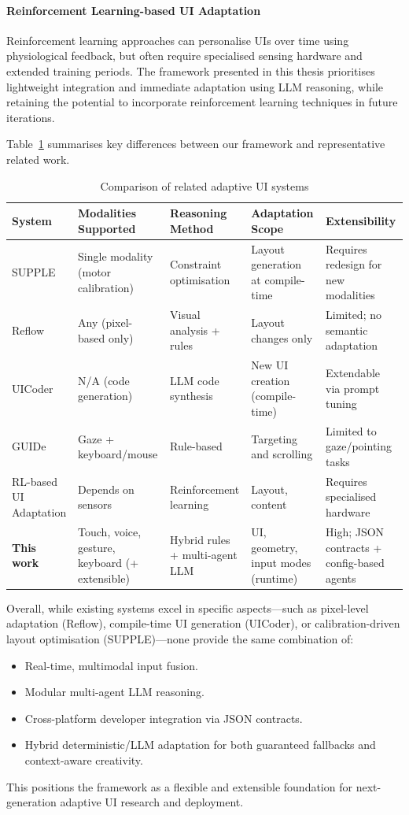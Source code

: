\documentclass[openany]{book}
\begin{document}
\paragraph{Reinforcement Learning-based UI Adaptation \cite{gaspar2023learning}}
Reinforcement learning approaches can personalise UIs over time using physiological feedback, but often require specialised sensing hardware and extended training periods. The framework presented in this thesis prioritises lightweight integration and immediate adaptation using LLM reasoning, while retaining the potential to incorporate reinforcement learning techniques in future iterations.

\medskip
Table~\ref{tab:related-comparison} summarises key differences between our framework and representative related work.

\begin{table}[h]
\centering
\caption{Comparison of related adaptive UI systems}
\label{tab:related-comparison}
\begin{tabular}{p{3cm}p{2.5cm}p{3cm}p{3cm}p{3cm}}
\toprule
\textbf{System} & \textbf{Modalities Supported} & \textbf{Reasoning Method} & \textbf{Adaptation Scope} & \textbf{Extensibility} \\
\midrule
SUPPLE & Single modality (motor calibration) & Constraint optimisation & Layout generation at compile-time & Requires redesign for new modalities \\
Reflow & Any (pixel-based only) & Visual analysis + rules & Layout changes only & Limited; no semantic adaptation \\
UICoder & N/A (code generation) & LLM code synthesis & New UI creation (compile-time) & Extendable via prompt tuning \\
GUIDe & Gaze + keyboard/mouse & Rule-based & Targeting and scrolling & Limited to gaze/pointing tasks \\
RL-based UI Adaptation & Depends on sensors & Reinforcement learning & Layout, content & Requires specialised hardware \\
\textbf{This work} & Touch, voice, gesture, keyboard (+ extensible) & Hybrid rules + multi-agent LLM & UI, geometry, input modes (runtime) & High; JSON contracts + config-based agents \\
\bottomrule
\end{tabular}
\end{table}

Overall, while existing systems excel in specific aspects—such as pixel-level adaptation (Reflow), compile-time UI generation (UICoder), or calibration-driven layout optimisation (SUPPLE)—none provide the same combination of:
\begin{itemize}
    \item Real-time, multimodal input fusion.
    \item Modular multi-agent LLM reasoning.
    \item Cross-platform developer integration via JSON contracts.
    \item Hybrid deterministic/LLM adaptation for both guaranteed fallbacks and context-aware creativity.
\end{itemize}
This positions the framework as a flexible and extensible foundation for next-generation adaptive UI research and deployment.
\newpage
\end{document}
